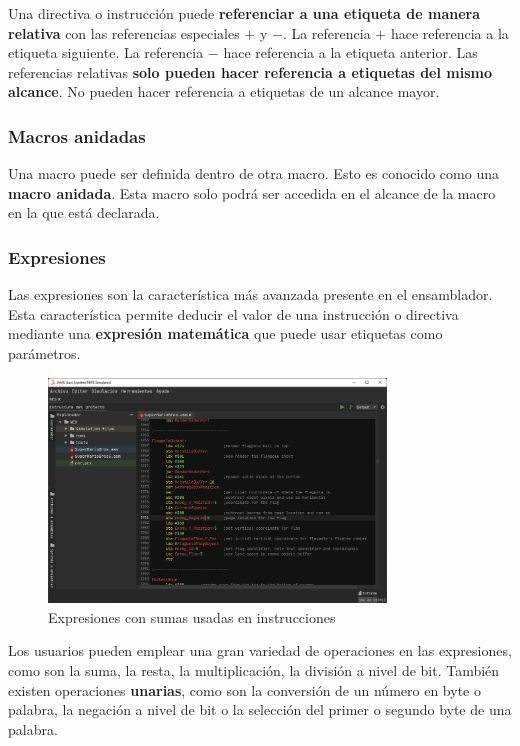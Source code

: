 Una directiva o instrucción puede \textbf{referenciar a una etiqueta de manera
relativa} con las referencias especiales $+$ y $-$.
La referencia $+$ hace referencia a la etiqueta siguiente.
La referencia $-$ hace referencia a la etiqueta anterior.
Las referencias relativas \textbf{solo pueden hacer referencia
a etiquetas del mismo alcance}.
No pueden hacer referencia a etiquetas de un alcance mayor.

\subsubsection{Macros anidadas}\label{subsubsec:macros-anidadas}

Una macro puede ser definida dentro de otra macro.
Esto es conocido como una \textbf{macro anidada}.
Esta macro solo podrá ser accedida en el alcance de la macro
en la que está declarada.

\subsubsection{Expresiones}\label{subsubsec:expresiones}

Las expresiones son la característica más avanzada
presente en el ensamblador.
Esta característica permite deducir el valor
de una instrucción o directiva mediante una \textbf{expresión matemática}
que puede usar etiquetas como parámetros.

\begin{figure}[h]
    \centering
    \includegraphics[width=0.8\textwidth]{images/nes/nes-expressions}
    \caption{Expresiones con sumas usadas en instrucciones}
    \label{fig:nes-expressions}
\end{figure}

Los usuarios pueden emplear una gran variedad de operaciones
en las expresiones, como son la suma, la resta, la multiplicación,
la división  a nivel de bit.
También existen operaciones \textbf{unarias}, como son
la conversión de un número en byte o palabra,
la negación a nivel de bit o la selección del
primer o segundo byte de una palabra.

